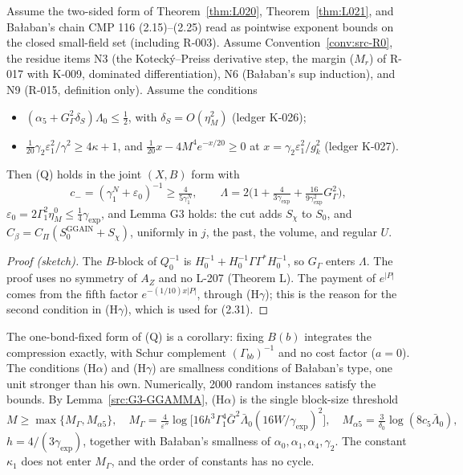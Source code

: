 \begin{theorem}[Lemma G3 (N2)]\label{thm:L025}
Assume the two-sided form of Theorem~\ref{thm:L020}, Theorem~\ref{thm:L021}, and Ba{\l}aban's chain CMP 116 (2.15)--(2.25) read as pointwise exponent bounds on the closed small-field set (including R-003). Assume Convention~\ref{conv:src-R0}, the residue items N3 (the Kotecký--Preiss derivative step, the margin ($M_r$) of R-017 with K-009, dominated differentiation), N6 (Ba{\l}aban's sup induction), and N9 (R-015, definition only). Assume the conditions
\begin{itemize}
\item[(H$\alpha$)] $(\alpha_5+G_\Gamma^2\delta_S)\Lambda_0\le\tfrac12$, with $\delta_S=O(\eta_M^2)$ (ledger K-026);
\item[(H$\gamma$)] $\tfrac1{20}\gamma_2\varepsilon_1^2/\gamma^2\ge4\kappa+1$, and $\tfrac1{20}x-4M^4e^{-x/20}\ge0$ at $x=\gamma_2\varepsilon_1^2/g_k^2$ (ledger K-027).
\end{itemize}
Then (Q) holds in the joint $(X,B)$ form with
\[ c_-=(\gamma_1^N+\varepsilon_0)^{-1}\ge\tfrac{4}{5\gamma_1^N},\qquad \Lambda=2\Big(1+\tfrac{4}{3\gamma_{\exp}}+\tfrac{16}{9\gamma_{\exp}^2}G_\Gamma^2\Big), \]
$\varepsilon_0=2\Gamma_1^2\eta_M^0\le\tfrac14\gamma_{\exp}$, and Lemma G3 holds: the cut adds $S_\chi$ to $S_0$, and $C_\beta=C_\Pi(S_0^{\mathrm{GGAIN}}+S_\chi)$, uniformly in $j$, the past, the volume, and regular $U$.
\end{theorem}
\begin{proof}[Proof (sketch)]
The $B$-block of $Q_0^{-1}$ is $H_0^{-1}+H_0^{-1}\Gamma\Gamma^*H_0^{-1}$, so $G_\Gamma$ enters $\Lambda$. The proof uses no symmetry of $A_Z$ and no L-207 (Theorem L). The payment of $e^{|P|}$ comes from the fifth factor $e^{-(1/10)x|P|}$, through (H$\gamma$); this is the reason for the second condition in (H$\gamma$), which is used for (2.31).
\end{proof}
The one-bond-fixed form of (Q) is a corollary: fixing $B(b)$ integrates the compression exactly, with Schur complement $(\Gamma_{bb})^{-1}$ and no cost factor ($a=0$). The conditions (H$\alpha$) and (H$\gamma$) are smallness conditions of Ba{\l}aban's type, one unit stronger than his own. Numerically, 2000 random instances satisfy the bounds. By Lemma~\ref{src:G3-GGAMMA}, (H$\alpha$) is the single block-size threshold
\[ M\ge\max\{M_\Gamma,M_{\alpha5}\},\quad M_\Gamma=\tfrac{4}{\varepsilon''}\log\big[16h^3\Gamma_1^4\bar G^2\bar\Lambda_0(16W/\gamma_{\exp})^2\big],\quad M_{\alpha5}=\tfrac{3}{\delta_0}\log(8c_5\bar\Lambda_0), \]
$h=4/(3\gamma_{\exp})$, together with Ba{\l}aban's smallness of $\alpha_0,\alpha_1,\alpha_4,\gamma_2$. The constant $\kappa_1$ does not enter $M_\Gamma$, and the order of constants has no cycle.

